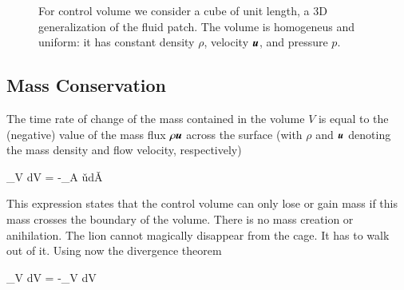 \begin{figure}
  \begin{center}
  \end{center}
  \caption[]{For control volume we consider a cube of unit length, a
    3D generalization of the fluid patch. The
    volume is homogeneus and uniform: it has constant density $\rho$, velocity ${\boldsymbol{u}}$, and pressure
    $p$. }
  \label{fig:controlvolume}
\end{figure}


\subsection{Mass Conservation}

The time rate of change of the mass contained in the volume $V$ is equal to the (negative)
value of the mass flux $\rho {\boldsymbol{u}}$ across the surface (with $\rho$ and ${\boldsymbol{u}}$ denoting the mass density and
flow velocity, respectively)

\beq
{} \int_V \rho dV = -\oint_A \rho \v{u}\cdot d\v{A} 
\eeq

This expression states that the control volume can only lose or gain
mass if this mass crosses the boundary of the volume. There is no mass
creation or anihilation. The lion cannot magically disappear from the
cage. It has to walk out of it. Using now the divergence theorem 

\beq
{} \int_V \rho dV = -\int_V dV
\eeq

